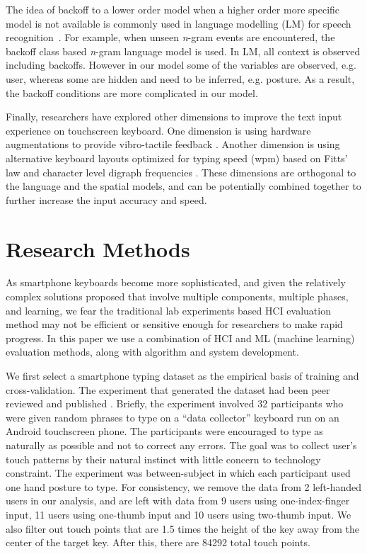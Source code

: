 \documentclass{sigchi}
\begin{document}
The idea of backoff to a lower order model when a higher order more specific 
model is not available is commonly used in language modelling (LM) for speech 
recognition~\cite{Katz:1987, Zitouni:2007}. For example, when unseen 
\textit{n}-gram events are encountered, the backoff class based \textit{n}-gram 
language model is used.  In LM,  all context is observed including backoffs. 
However in our model some of the variables are observed, e.g. user, whereas some
are hidden and need to be inferred, e.g. posture. As a result, the backoff 
conditions are more complicated in our model.

Finally, researchers have explored other dimensions to improve the 
text input experience on touchscreen keyboard. One dimension is using hardware
augmentations to provide vibro-tactile feedback \cite{Brewster:2007, Hoggan:2008}. 
Another dimension is using alternative keyboard layouts optimized for typing speed (wpm)
based on Fitts' law and character level digraph frequencies \cite{Zhai:2000, MacKenzie:1999}.
These dimensions are orthogonal to the language and the spatial models, and can be potentially 
combined together to further increase the input accuracy and speed.

\section{Research Methods}
As smartphone keyboards become more sophisticated, and given the relatively
complex solutions proposed that involve multiple components, multiple phases, 
and learning,  we fear the traditional lab experiments based HCI evaluation 
method may not be efficient or sensitive enough for researchers to make rapid 
progress. In this paper we use a combination of HCI and ML (machine learning) 
evaluation methods, along with algorithm and system development.

We first select a smartphone typing dataset as the empirical basis of training 
and cross-validation. The experiment that generated the dataset had been peer 
reviewed and published \cite{Azenkot:2012}. Briefly, the experiment involved 32
participants who were given random phrases to type on a ``data collector''
keyboard run on an Android touchscreen phone.  The participants were encouraged 
to type as naturally as possible and not to correct any errors. The goal was to 
collect user’s touch patterns by their natural instinct with little concern to 
technology constraint. The experiment was between-subject in which each 
participant used one hand posture to type. For consistency, we remove the data 
from 2 left-handed users in our analysis, and are left with data from 9 users 
using one-index-finger input, 11 users using one-thumb input and 10 users using 
two-thumb input.  We also 
filter out touch points that are 1.5 times the height of the key away from 
the center of the target key. After this, there are 84292 total touch points.
 
\end{document}
